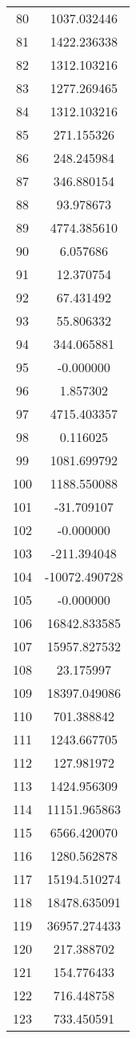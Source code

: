 \documentclass[12pt]{article}
\begin{document}
\begin{longtable}{@{}cc@{}}
80 & 1037.032446 \\
81 & 1422.236338 \\
82 & 1312.103216 \\
83 & 1277.269465 \\
84 & 1312.103216 \\
85 & 271.155326 \\
86 & 248.245984 \\
87 & 346.880154 \\
88 & 93.978673 \\
89 & 4774.385610 \\
90 & 6.057686 \\
91 & 12.370754 \\
92 & 67.431492 \\
93 & 55.806332 \\
94 & 344.065881 \\
95 & -0.000000 \\
96 & 1.857302 \\
97 & 4715.403357 \\
98 & 0.116025 \\
99 & 1081.699792 \\
100 & 1188.550088 \\
101 & -31.709107 \\
102 & -0.000000 \\
103 & -211.394048 \\
104 & -10072.490728 \\
105 & -0.000000 \\
106 & 16842.833585 \\
107 & 15957.827532 \\
108 & 23.175997 \\
109 & 18397.049086 \\
110 & 701.388842 \\
111 & 1243.667705 \\
112 & 127.981972 \\
113 & 1424.956309 \\
114 & 11151.965863 \\
115 & 6566.420070 \\
116 & 1280.562878 \\
117 & 15194.510274 \\
118 & 18478.635091 \\
119 & 36957.274433 \\
120 & 217.388702 \\
121 & 154.776433 \\
122 & 716.448758 \\
123 & 733.450591 \\

\end{longtable}
\end{document}
